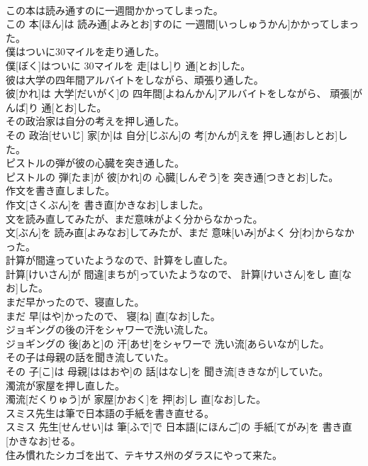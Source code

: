 \documentclass[8pt]{extreport}
\begin{document}
\begin{CJK}{UTF8}{min}
\\	この本は読み通すのに一週間かかってしまった。	
\\	この 本[ほん]は 読み通[よみとお]すのに 一週間[いっしゅうかん]かかってしまった。
\\	僕はついに30マイルを走り通した。	
\\	僕[ぼく]はついに 30マイルを 走[はし]り 通[とお]した。
\\	彼は大学の四年間アルバイトをしながら、頑張り通した。	
\\	彼[かれ]は 大学[だいがく]の 四年間[よねんかん]アルバイトをしながら、 頑張[がんば]り 通[とお]した。
\\	その政治家は自分の考えを押し通した。	
\\	その 政治[せいじ] 家[か]は 自分[じぶん]の 考[かんが]えを 押し通[おしとお]した。
\\	ピストルの弾が彼の心臓を突き通した。	
\\	ピストルの 弾[たま]が 彼[かれ]の 心臓[しんぞう]を 突き通[つきとお]した。
\\	作文を書き直しました。	
\\	作文[さくぶん]を 書き直[かきなお]しました。
\\	文を読み直してみたが、まだ意味がよく分からなかった。	
\\	文[ぶん]を 読み直[よみなお]してみたが、まだ 意味[いみ]がよく 分[わ]からなかった。
\\	計算が間違っていたようなので、計算をし直した。	
\\	計算[けいさん]が 間違[まちが]っていたようなので、 計算[けいさん]をし 直[なお]した。
\\	まだ早かったので、寝直した。	
\\	まだ 早[はや]かったので、 寝[ね] 直[なお]した。
\\	ジョギングの後の汗をシャワーで洗い流した。	
\\	ジョギングの 後[あと]の 汗[あせ]をシャワーで 洗い流[あらいなが]した。
\\	その子は母親の話を聞き流していた。	
\\	その 子[こ]は 母親[ははおや]の 話[はなし]を 聞き流[ききなが]していた。
\\	濁流が家屋を押し直した。	
\\	濁流[だくりゅう]が 家屋[かおく]を 押[お]し 直[なお]した。
\\	スミス先生は筆で日本語の手紙を書き直せる。	
\\	スミス 先生[せんせい]は 筆[ふで]で 日本語[にほんご]の 手紙[てがみ]を 書き直[かきなお]せる。
\\	住み慣れたシカゴを出て、テキサス州のダラスにやって来た。	

\end{CJK}
\end{document}

